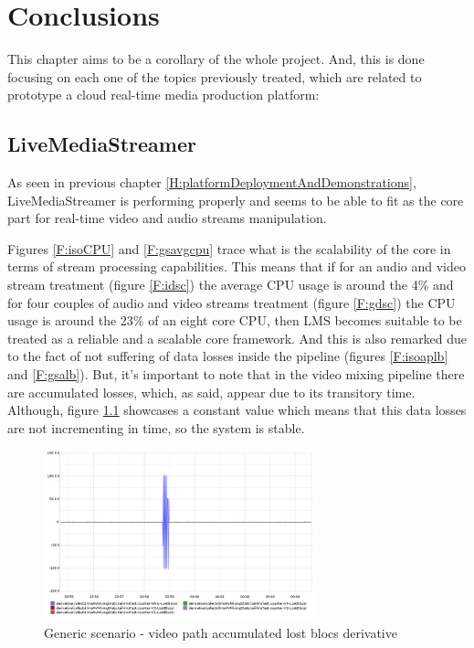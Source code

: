 \chapter{Conclusions}\label{C:conclusions}

This chapter aims to be a corollary of the whole project. And, this is done focusing on each one of the topics previously treated, which are related to prototype a cloud real-time media production platform:

\section{LiveMediaStreamer}

As seen in previous chapter \ref{H:platformDeploymentAndDemonstrations}, LiveMediaStreamer is performing properly and seems to be able to fit as the core part for real-time video and audio streams manipulation.

Figures \ref{F:isoCPU} and \ref{F:gsavgcpu} trace what is the scalability of the core in terms of stream processing capabilities. This means that if for an audio and video stream treatment (figure \ref{F:idsc}) the average CPU usage is around the 4\% and for four couples of audio and video streams treatment (figure \ref{F:gdsc}) the CPU usage is around the 23\% of an eight core CPU, then LMS becomes suitable to be treated as a reliable and a scalable core framework. And this is also remarked due to the fact of not suffering of data losses inside the pipeline (figures \ref{F:isoaplb} and \ref{F:gsalb}). But, it's important to note that in the video mixing pipeline there are accumulated losses, which, as said, appear due to its transitory time. Although, figure \ref{F:gsvpalbd} showcases a constant value which means that this data losses are not incrementing in time, so the system is stable.

\begin{figure}[!htb]
\begin{center}
\includegraphics[width=0.70\textwidth]{./images/testAVMix/AVMixVideoLostBlocsDerivative.png}
\caption{Generic scenario - video path accumulated lost blocs derivative}
\label{F:gsvpalbd}
\end{center}
\end{figure}

